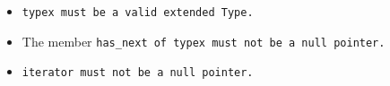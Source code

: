 

\begin{itemize}

\item \tt{typex} must be a valid extended \tt{Type}.

\item The member \tt{has_next} of \tt{typex} must not be a null pointer.

\item \tt{iterator} must not be a null pointer.

\end{itemize}
